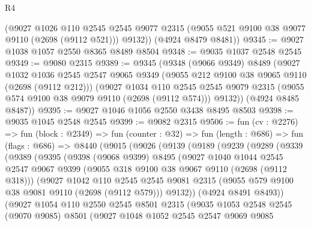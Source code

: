 \begin{lexlean}{R4}
\begin{coremodule}
        (@9027
          @1026
          @110
          @2545
          @2545
          @9077
          @2315
          (@9055 @521 @9100 @38 @9077 @9110 (@2698 (@9112 @521)))
          @9132))
      (@4924 @8479 @8481))
@9345 := @9027 @1038 @1057 @2550 @8365 @8489 @8504
@9348 := @9035 @1037 @2548 @2545
@9349 := @9080 @2315
@9389 := @9345
    (@9348
      (@9066 @9349)
      @8489
      (@9027
        @1032
        @1036
        @2545
        @2547
        @9065
        @9349
        (@9055 @212 @9100 @38 @9065 @9110 (@2698 (@9112 @212)))
        (@9027
          @1034
          @110
          @2545
          @2545
          @9079
          @2315
          (@9055 @574 @9100 @38 @9079 @9110 (@2698 (@9112 @574)))
          @9132))
      (@4924 @8485 @8487))
@9395 := @9027 @1046 @1056 @2550 @3438 @8495 @8503
@9398 := @9035 @1045 @2548 @2545
@9399 := @9082 @2315
@9506 := fun (cv : @2276) =>
  fun (block : @2349) =>
  fun (counter : @32) =>
  fun (length : @686) =>
  fun (flags : @686) =>
  @8440
    (@9015
      (@9026
        (@9139
          (@9189
            (@9239
              (@9289
                (@9339
                  (@9389
                    (@9395
                      (@9398
                        (@9068 @9399)
                        @8495
                        (@9027
                          @1040
                          @1044
                          @2545
                          @2547
                          @9067
                          @9399
                          (@9055 @318 @9100 @38 @9067 @9110 (@2698 (@9112 @318)))
                          (@9027
                            @1042
                            @110
                            @2545
                            @2545
                            @9081
                            @2315
                            (@9055 @579 @9100 @38 @9081 @9110 (@2698 (@9112 @579)))
                            @9132))
                        (@4924 @8491 @8493))
                      (@9027
                        @1054
                        @110
                        @2550
                        @2545
                        @8501
                        @2315
                        (@9035
                          @1053
                          @2548
                          @2545
                          (@9070 @9085)
                          @8501
                          (@9027
                            @1048
                            @1052
                            @2545
                            @2547
                            @9069
                            @9085

\end{coremodule}
\end{lexlean}
